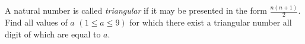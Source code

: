 A natural number is called \textit{triangular} if it may be presented in the form $\frac{n(n+1)}2$. Find all values of $a$ $(1\le a\le9)$ for which there exist a triangular number all digit of which are equal to $a$.